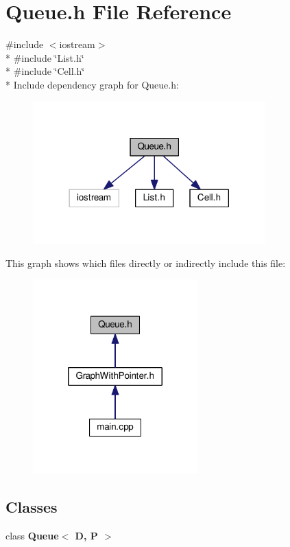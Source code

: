 \section{Queue.\-h File Reference}
\label{_queue_8h}
{\ttfamily \#include $<$iostream$>$}\\*
{\ttfamily \#include \char`\"{}List.\-h\char`\"{}}\\*
{\ttfamily \#include \char`\"{}Cell.\-h\char`\"{}}\\*
Include dependency graph for Queue.\-h\-:
\nopagebreak
\begin{figure}[H]
\begin{center}
\leavevmode
\includegraphics[width=254pt]{_queue_8h__incl}
\end{center}
\end{figure}
This graph shows which files directly or indirectly include this file\-:
\nopagebreak
\begin{figure}[H]
\begin{center}
\leavevmode
\includegraphics[width=180pt]{_queue_8h__dep__incl}
\end{center}
\end{figure}
\subsection*{Classes}
\begin{DoxyCompactItemize}
\item 
class {\bf Queue$<$ D, P $>$}
\end{DoxyCompactItemize}
